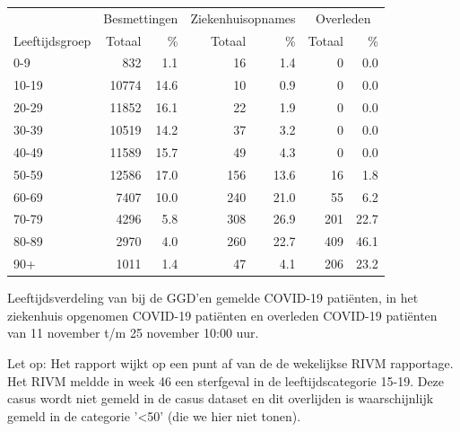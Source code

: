 \documentclass[
  english,
  man,floatsintext]{apa6}
\begin{document}
\begin{table}[H]
\centering\begingroup\fontsize{11}{13}\selectfont

\begin{threeparttable}
\begin{tabular}{lrrrrrr}
\toprule
\multicolumn{1}{c}{ } & \multicolumn{2}{c}{Besmettingen} & \multicolumn{2}{c}{Ziekenhuisopnames} & \multicolumn{2}{c}{Overleden} \\
\cmidrule(l{3pt}r{3pt}){2-3} \cmidrule(l{3pt}r{3pt}){4-5} \cmidrule(l{3pt}r{3pt}){6-7}
Leeftijdsgroep & Totaal & \% & Totaal & \% & Totaal & \%\\
\midrule
0-9 & 832 & 1.1 & 16 & 1.4 & 0 & 0.0\\
10-19 & 10774 & 14.6 & 10 & 0.9 & 0 & 0.0\\
20-29 & 11852 & 16.1 & 22 & 1.9 & 0 & 0.0\\
30-39 & 10519 & 14.2 & 37 & 3.2 & 0 & 0.0\\
40-49 & 11589 & 15.7 & 49 & 4.3 & 0 & 0.0\\
50-59 & 12586 & 17.0 & 156 & 13.6 & 16 & 1.8\\
60-69 & 7407 & 10.0 & 240 & 21.0 & 55 & 6.2\\
70-79 & 4296 & 5.8 & 308 & 26.9 & 201 & 22.7\\
80-89 & 2970 & 4.0 & 260 & 22.7 & 409 & 46.1\\
90+ & 1011 & 1.4 & 47 & 4.1 & 206 & 23.2\\
\bottomrule
\end{tabular}
\begin{tablenotes}
\item[1] Leeftijdsverdeling van bij de GGD’en gemelde COVID-19 patiënten, in het ziekenhuis opgenomen COVID-19 patiënten en overleden COVID-19 patiënten van 11 november t/m 25 november 10:00 uur.
\item[2] Let op: Het rapport wijkt op een punt af van de de wekelijkse RIVM rapportage. Het RIVM meldde in week 46 een sterfgeval in de leeftijdscategorie 15-19. Deze casus wordt niet gemeld in de casus dataset en dit overlijden is waarschijnlijk gemeld in de categorie '<50' (die we hier niet tonen).
\end{tablenotes}
\end{threeparttable}
\endgroup{}
\end{table}

\newpage
\end{document}
